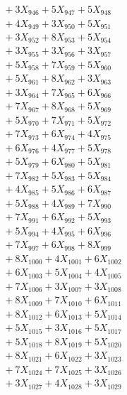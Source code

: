 \documentclass[a4paper,10pt]{article}
\begin{document}
{\begin{align}
&\;  + 3 X_{946} + 5 X_{947} + 5 X_{948} \\[0.3ex]
&\;  + 4 X_{949} + 3 X_{950} + 5 X_{951} \\[0.3ex]
&\;  + 3 X_{952} + 8 X_{953} + 5 X_{954} \\[0.3ex]
&\;  + 3 X_{955} + 3 X_{956} + 3 X_{957} \\[0.3ex]
&\;  + 5 X_{958} + 7 X_{959} + 5 X_{960} \\[0.3ex]
&\;  + 5 X_{961} + 8 X_{962} + 3 X_{963} \\[0.3ex]
&\;  + 3 X_{964} + 7 X_{965} + 6 X_{966} \\[0.3ex]
&\;  + 7 X_{967} + 8 X_{968} + 5 X_{969} \\[0.5ex]\allowbreak
&\;  + 5 X_{970} + 7 X_{971} + 5 X_{972} \\[0.3ex]
&\;  + 7 X_{973} + 6 X_{974} + 4 X_{975} \\[0.3ex]
&\;  + 6 X_{976} + 4 X_{977} + 5 X_{978} \\[0.3ex]
&\;  + 5 X_{979} + 6 X_{980} + 5 X_{981} \\[0.3ex]
&\;  + 7 X_{982} + 5 X_{983} + 5 X_{984} \\[0.3ex]
&\;  + 4 X_{985} + 5 X_{986} + 6 X_{987} \\[0.3ex]
&\;  + 5 X_{988} + 4 X_{989} + 7 X_{990} \\[0.3ex]
&\;  + 7 X_{991} + 6 X_{992} + 5 X_{993} \\[0.3ex]
&\;  + 5 X_{994} + 4 X_{995} + 6 X_{996} \\[0.3ex]
&\;  + 7 X_{997} + 6 X_{998} + 8 X_{999} \\[0.5ex]\allowbreak
&\;  + 8 X_{1000} + 4 X_{1001} + 6 X_{1002} \\[0.3ex]
&\;  + 6 X_{1003} + 5 X_{1004} + 4 X_{1005} \\[0.3ex]
&\;  + 7 X_{1006} + 3 X_{1007} + 3 X_{1008} \\[0.3ex]
&\;  + 8 X_{1009} + 7 X_{1010} + 6 X_{1011} \\[0.3ex]
&\;  + 8 X_{1012} + 6 X_{1013} + 5 X_{1014} \\[0.3ex]
&\;  + 5 X_{1015} + 3 X_{1016} + 5 X_{1017} \\[0.3ex]
&\;  + 5 X_{1018} + 8 X_{1019} + 5 X_{1020} \\[0.3ex]
&\;  + 8 X_{1021} + 6 X_{1022} + 3 X_{1023} \\[0.3ex]
&\;  + 7 X_{1024} + 7 X_{1025} + 3 X_{1026} \\[0.3ex]
&\;  + 3 X_{1027} + 4 X_{1028} + 3 X_{1029} \\[0.5ex]\allowbreak

\end{align}}
\end{document}
